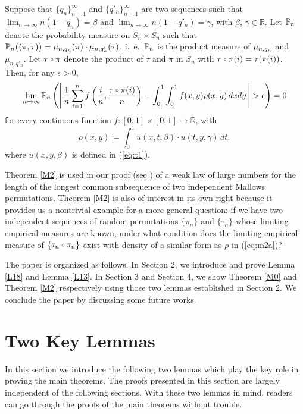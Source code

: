 \begin{theorem}\label{M2}
Suppose that $\{q_n\}_{n=1}^{\infty}$ and $\{q'_n\}_{n=1}^{\infty}$ are two sequences such that $\lim_{n\to\infty} n (1-q_n) = \beta$  and
$\lim_{n\to\infty} n (1-q'_n) = \gamma$, with $\beta$, $\gamma \in \mathbb{R}$. Let $\mathbb{P}_n$ denote the probability measure on $S_n \times S_n$
such that $\mathbb{P}_n\big((\pi, \tau)\big) = \mu_{n, q_n}(\pi) \cdot \mu_{n, q'_n}(\tau)$, i.~e.~$\mathbb{P}_n$ is the product measure of $\mu_{n, q_n}$ and $\mu_{n, q'_n}$.
Let $\tau \ccirc \pi$ denote the product of $\tau$ and $\pi$ in $S_n$ with $\tau \ccirc \pi(i) = \tau(\pi(i))$.
Then, for any $\epsilon > 0$,
\[
\lim_{n \to \infty}\p_n\left(\left|\, \frac{1}{n}\sum_{i=1}^{n}f\left(\frac{i}{n}, \frac{\tau \ccirc \pi(i)}{n}\right) -
  \int_0^1\int_0^1 f(x, y) \rho(x, y)\,dxdy\, \right| > \epsilon \right) = 0
\]
for every continuous function $f: [0,1]\times[0,1] \rightarrow \mathbb{R}$, with
\begin{equation}\label{eq:m2a}
\rho(x, y) \coloneqq \int_{0}^{1} u(x, t, \beta)\cdot u(t, y, \gamma)\,dt,
\end{equation}
where $u(x, y, \beta)$ is defined in (\ref{eq:t1}).
\end{theorem}

Theorem \ref{M2} is used in our proof (see \cite{Ke}) of a weak law of large numbers for the length of the longest common subsequence of two independent Mallows permutations. Theorem \ref{M2} is also of interest in its own right because it provides us a nontrivial example for a more general question: if we have two independent sequences of random permutations $\{\pi_n\}$ and $\{\tau_n\}$ whose limiting empirical measures are known, under what condition does the limiting empirical measure of $\{\tau_n\ccirc\pi_n\}$ exist with density of a similar form as $\rho$ in (\ref{eq:m2a})?


The paper is organized as follows. In Section 2, we introduce and prove Lemma \ref{L18} and Lemma \ref{L13}. In Section 3 and Section 4, we show Theorem \ref{M0} and Theorem \ref{M2} respectively using those two lemmas established in Section 2. We conclude the paper by discussing some future works.



\section{Two Key Lemmas}
In this section we introduce the following two lemmas which play the key role in proving the main theorems. The proofs presented in this section are largely independent of the following sections. With these two lemmas in mind, readers can go through the proofs of the main theorems without trouble.

